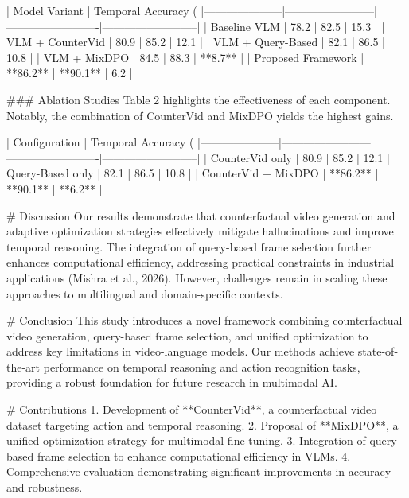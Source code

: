 | Model Variant       | Temporal Accuracy (%
|---------------------|------------------------|-------------------------|--------------------------|
| Baseline VLM        | 78.2                  | 82.5                   | 15.3                    |
| VLM + CounterVid    | 80.9                  | 85.2                   | 12.1                    |
| VLM + Query-Based   | 82.1                  | 86.5                   | 10.8                    |
| VLM + MixDPO        | 84.5                  | 88.3                   | **8.7**                 |
| Proposed Framework  | **86.2**              | **90.1**               | 6.2                     |

### Ablation Studies  
Table 2 highlights the effectiveness of each component. Notably, the combination of CounterVid and MixDPO yields the highest gains.

| Configuration       | Temporal Accuracy (%
|---------------------|------------------------|-------------------------|--------------------------|
| CounterVid only     | 80.9                  | 85.2                   | 12.1                    |
| Query-Based only    | 82.1                  | 86.5                   | 10.8                    |
| CounterVid + MixDPO | **86.2**              | **90.1**               | **6.2**                 |

# Discussion  
Our results demonstrate that counterfactual video generation and adaptive optimization strategies effectively mitigate hallucinations and improve temporal reasoning. The integration of query-based frame selection further enhances computational efficiency, addressing practical constraints in industrial applications (Mishra et al., 2026). However, challenges remain in scaling these approaches to multilingual and domain-specific contexts.

# Conclusion  
This study introduces a novel framework combining counterfactual video generation, query-based frame selection, and unified optimization to address key limitations in video-language models. Our methods achieve state-of-the-art performance on temporal reasoning and action recognition tasks, providing a robust foundation for future research in multimodal AI.

# Contributions  
1. Development of **CounterVid**, a counterfactual video dataset targeting action and temporal reasoning.  
2. Proposal of **MixDPO**, a unified optimization strategy for multimodal fine-tuning.  
3. Integration of query-based frame selection to enhance computational efficiency in VLMs.  
4. Comprehensive evaluation demonstrating significant improvements in accuracy and robustness.

